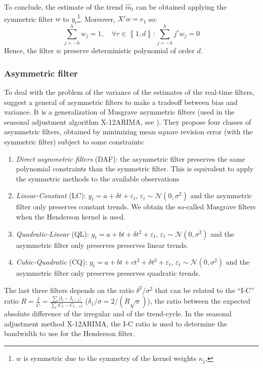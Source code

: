 \documentclass[fleqn,10pt]{latex/stylish_article} %
\newcommand\1{\mathds{1}}
\begin{document}
To conclude, the estimate of the trend \(\hat{m}_{t}\) can be obtained applying the symmetric filter \(w\) to \(y_t\)\footnote{
  \(w\) is symmetric due to the symmetry of the kernel weights \(\kappa_j\).}.
Moreover, \(X'w=e_{1}\) so:
\[
\sum_{j=-h}^{h}w_{j}=1,\quad\forall r\in\left\llbracket 1,d\right\rrbracket :\sum_{j=-h}^{h}j^{r}w_{j}=0
\]
Hence, the filter \(w\) preserve deterministic polynomial of order \(d\).

\hypertarget{asymmetric-filter}{%
\subsubsection{Asymmetric filter}\label{asymmetric-filter}}

To deal with the problem of the variance of the estimates of the real-time filters, \citet{proietti2008} suggest a general of asymmetric filters to make a tradeoff between bias and variance.
It is a generalization of Musgrave asymmetric filters (used in the seasonal adjustment algorithm X-12ARIMA, see \citet{musgrave1964set}). They propose four classes of asymmetric filters, obtained by minimizing mean square revision error (with the symmetric filter) subject to some constraints:

\begin{enumerate}
\def\labelenumi{\arabic{enumi}.}
\item
  \emph{Direct asymmetric filters} (DAF): the asymmetric filter preserves the same polynomial constraints than the symmetric filter. This is equivalent to apply the symmetric methods to the available observations
\item
  \emph{Linear-Constant} (LC): \(y_t=a+\delta t+\varepsilon_t\), \(\varepsilon_t\sim\mathcal N(0,\sigma^2)\) and the asymmetric filter only preserves constant trends. We obtain the so-called Musgrave filters when the Henderson kernel is used.
\item
  \emph{Quadratic-Linear} (QL): \(y_t=a+bt+\delta t^2+\varepsilon_t\), \(\varepsilon_t\sim\mathcal N(0,\sigma^2)\) and the asymmetric filter only preserves preserves linear trends.
\item
  \emph{Cubic-Quadratic} (CQ): \(y_t=a+bt+ct^2+\delta t^3+\varepsilon_t\), \(\varepsilon_t\sim\mathcal N(0,\sigma^2)\) and the asymmetric filter only preserves preserves quadratic trends.
\end{enumerate}

The last three filters depends on the ratio \(\delta^2/\sigma^2\) that can be related to the ``I-C'' ratio \(R=\frac{\bar{I}}{\bar{C}}=\frac{\sum\lvert I_t-I_{t-1}\rvert}{\sum\lvert C_t-C_{t-1}\rvert}\) (\(\delta_1/\sigma=2/(R\sqrt{\pi})\)), the ratio between the expected absolute difference of the irregular and of the trend-cycle.
In the seasonal adjustment method X-12ARIMA, the I-C ratio is used to determine the bandwidth to use for the Henderson filter.
\end{document}
